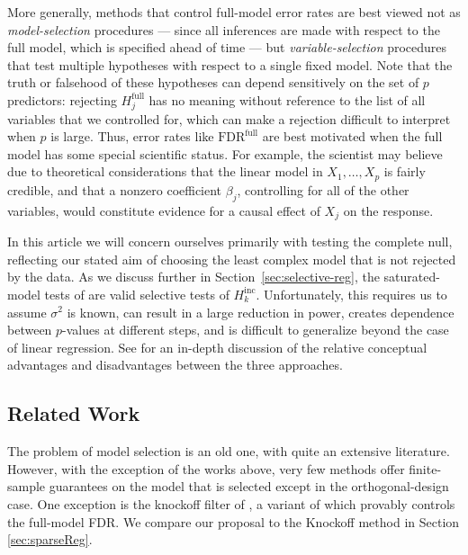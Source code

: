 \documentclass{article}
\begin{document}
More generally, methods that control full-model error rates are best viewed not as {\em model-selection} procedures --- since all inferences are made with respect to the full model, which is specified ahead of time --- but {\em variable-selection} procedures that test multiple hypotheses with respect to a single fixed model. Note that the truth or falsehood of these hypotheses can depend sensitively on the set of $p$ predictors: rejecting $H_j^{\text{full}}$ has no meaning without reference to the list of all variables that we controlled for, which can make a rejection difficult to interpret when $p$ is large. Thus, error rates like $\text{FDR}^{\text{full}}$ are best motivated when the full model has some special scientific status. For example, the scientist may believe due to theoretical considerations that the linear model in $X_1,\ldots,X_p$ is fairly credible, and that a nonzero coefficient $\beta_j$, controlling for all of the other variables, would constitute evidence for a causal effect of $X_j$ on the response.

In this article we will concern ourselves primarily with testing the complete null, reflecting our stated aim of choosing the least complex model that is not rejected by the data. As we discuss further in Section~\ref{sec:selective-reg}, the saturated-model tests of \citet{taylor2014exact} are valid selective tests of $H_k^{\text{inc}}$. Unfortunately, this requires us to assume $\sigma^2$ is known, can result in a large reduction in power, creates dependence between $p$-values at different steps, and is difficult to generalize beyond the case of linear regression. See \citet{gsell2013false} for an in-depth discussion of the relative conceptual advantages and disadvantages between the three approaches.


\subsection{Related Work}

The problem of model selection is an old one, with quite an extensive literature. However, with the exception of the works above, very few methods offer finite-sample guarantees on the model that is selected except in the orthogonal-design case. One  exception is the knockoff filter of \citet{barber2014controlling}, a variant of which provably controls the full-model FDR.
We compare our proposal to the Knockoff method in Section \ref{sec:sparseReg}.
\end{document}
